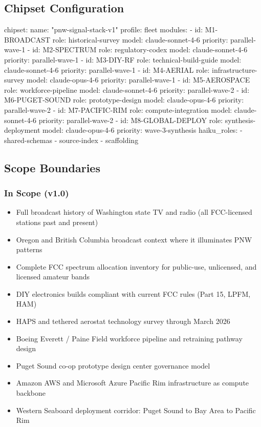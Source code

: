 \documentclass[11pt,letterpaper]{article}
\begin{document}
\subsection{Chipset Configuration}

\begin{asciibox}
chipset:
  name: "pnw-signal-stack-v1"
  profile: fleet
  modules:
    - id: M1-BROADCAST
      role: historical-survey
      model: claude-sonnet-4-6
      priority: parallel-wave-1
    - id: M2-SPECTRUM
      role: regulatory-codex
      model: claude-sonnet-4-6
      priority: parallel-wave-1
    - id: M3-DIY-RF
      role: technical-build-guide
      model: claude-sonnet-4-6
      priority: parallel-wave-1
    - id: M4-AERIAL
      role: infrastructure-survey
      model: claude-opus-4-6
      priority: parallel-wave-1
    - id: M5-AEROSPACE
      role: workforce-pipeline
      model: claude-sonnet-4-6
      priority: parallel-wave-2
    - id: M6-PUGET-SOUND
      role: prototype-design
      model: claude-opus-4-6
      priority: parallel-wave-2
    - id: M7-PACIFIC-RIM
      role: compute-integration
      model: claude-sonnet-4-6
      priority: parallel-wave-2
    - id: M8-GLOBAL-DEPLOY
      role: synthesis-deployment
      model: claude-opus-4-6
      priority: wave-3-synthesis
  haiku_roles:
    - shared-schemas
    - source-index
    - scaffolding
\end{asciibox}

\subsection{Scope Boundaries}

\subsubsection{In Scope (v1.0)}
\begin{itemize}
  \item Full broadcast history of Washington state TV and radio (all FCC-licensed stations past and present)
  \item Oregon and British Columbia broadcast context where it illuminates PNW patterns
  \item Complete FCC spectrum allocation inventory for public-use, unlicensed, and licensed amateur bands
  \item DIY electronics builds compliant with current FCC rules (Part 15, LPFM, HAM)
  \item HAPS and tethered aerostat technology survey through March 2026
  \item Boeing Everett / Paine Field workforce pipeline and retraining pathway design
  \item Puget Sound co-op prototype design center governance model
  \item Amazon AWS and Microsoft Azure Pacific Rim infrastructure as compute backbone
  \item Western Seaboard deployment corridor: Puget Sound to Bay Area to Pacific Rim
\end{itemize}
\end{document}
